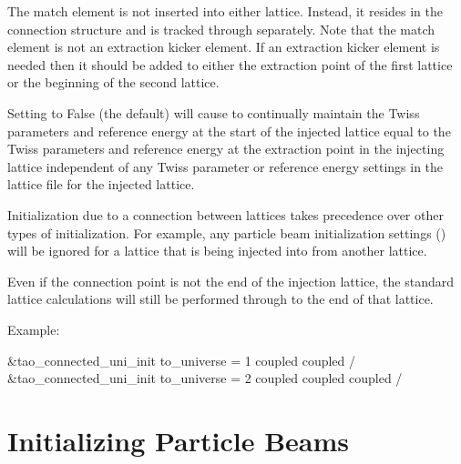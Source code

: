 {{{{{{{{{{{{{{{{The match element is not inserted into either lattice. Instead, it
resides in the \tao connection structure and is tracked through
separately. Note that the match element is not an extraction kicker
element. If an extraction kicker element is needed then it should be
added to either the extraction point of the first lattice or the
beginning of the second lattice.

Setting  to False (the default) will cause \tao to
continually maintain the  Twiss parameters and reference
energy at the start of the injected lattice equal to the 
Twiss parameters and reference energy at the extraction point in the
injecting lattice independent of any Twiss parameter or reference
energy settings in the lattice file for the injected lattice.

Initialization due to a connection between lattices takes precedence
over other types of initialization. For example, any particle beam
initialization settings () will be ignored for a
lattice that is being injected into from another lattice.

Even if the connection point is not the end of the injection lattice,
the standard lattice calculations will still be performed through to
the end of that lattice.

Example:
\begin{example}
  &tao_connected_uni_init
    to_universe = 1
    coupled%
    coupled%
  /
  &tao_connected_uni_init
    to_universe = 2
    coupled%
    coupled%
    coupled%
  /
\end{example}

\section{Initializing Particle Beams}
\label{s:beam.init}

}}}}}}}}}}}}}}}}

